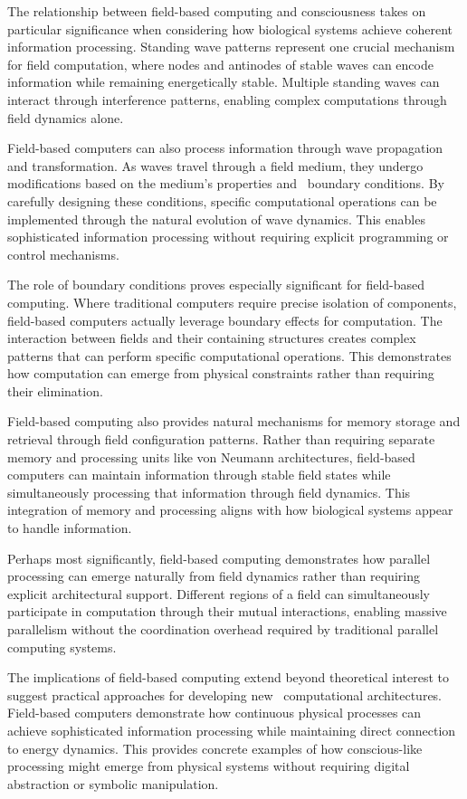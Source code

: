 The relationship between field-based computing and consciousness takes on particular significance when considering how biological systems achieve coherent information processing. Standing wave patterns represent one crucial mechanism for field computation, where nodes and antinodes of stable waves can encode information while remaining energetically stable. Multiple standing waves can interact through interference patterns, enabling complex computations through field dynamics alone.

Field-based computers can also process information through wave propagation and transformation. As waves travel through a field medium, they undergo modifications based on the medium's properties and~ boundary conditions. By carefully designing these conditions, specific computational operations can be implemented through the natural evolution of wave dynamics. This enables sophisticated information processing without requiring explicit programming or control mechanisms.

The role of boundary conditions proves especially significant for field-based computing. Where traditional computers require precise isolation of components, field-based computers actually leverage boundary effects for computation. The interaction between fields and their containing structures creates complex patterns that can perform specific computational operations. This demonstrates how computation can emerge from physical constraints rather than requiring their elimination.

Field-based computing also provides natural mechanisms for memory storage and retrieval through field configuration patterns. Rather than requiring separate memory and processing units like von Neumann architectures, field-based computers can maintain information through stable field states while simultaneously processing that information through field dynamics. This integration of memory and processing aligns with how biological systems appear to handle information.

Perhaps most significantly, field-based computing demonstrates how parallel processing can emerge naturally from field dynamics rather than requiring explicit architectural support. Different regions of a field can simultaneously participate in computation through their mutual interactions, enabling massive parallelism without the coordination overhead required by traditional parallel computing systems.

The implications of field-based computing extend beyond theoretical interest to suggest practical approaches for developing new~ computational architectures. Field-based computers demonstrate how continuous physical processes can achieve sophisticated information processing while maintaining direct connection to energy dynamics. This provides concrete examples of how conscious-like processing might emerge from physical systems without requiring digital abstraction or symbolic manipulation.

